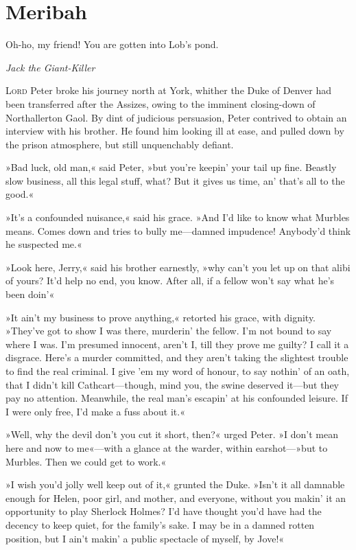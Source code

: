 
\chapter{Meribah}

\epigraph{Oh-ho, my friend! You are gotten into Lob's pond.}{\textit{Jack the Giant-Killer}}

\lettrine[lines=4]{L}{ord} Peter broke his journey north at York, whither the Duke of Denver had been transferred after the Assizes, owing to the imminent closing-down of Northallerton Gaol. By dint of judicious persuasion, Peter contrived to obtain an interview with his brother. He found him looking ill at ease, and pulled down by the prison atmosphere, but still unquenchably defiant.

»Bad luck, old man,« said Peter, »but you're keepin' your tail up fine. Beastly slow business, all this legal stuff, what? But it gives us time, an' that's all to the good.«

»It's a confounded nuisance,« said his grace. »And I'd like to know what Murbles means. Comes down and tries to bully me—damned impudence! Anybody'd think he suspected me.«

»Look here, Jerry,« said his brother earnestly, »why can't you let up on that alibi of yours? It'd help no end, you know. After all, if a fellow won't say what he's been doin'\longdash«

»It ain't my business to prove anything,« retorted his grace, with dignity. »They've got to show I was there, murderin' the fellow. I'm not bound to say where I was. I'm presumed innocent, aren't I, till they prove me guilty? I call it a disgrace. Here's a murder committed, and they aren't taking the slightest trouble to find the real criminal. I give 'em my word of honour, to say nothin' of an oath, that I didn't kill Cathcart—though, mind you, the swine deserved it—but they pay no attention. Meanwhile, the real man's escapin' at his confounded leisure. If I were only free, I'd make a fuss about it.«

»Well, why the devil don't you cut it short, then?« urged Peter. »I don't mean here and now to me«—with a glance at the warder, within earshot—»but to Murbles. Then we could get to work.«

»I wish you'd jolly well keep out of it,« grunted the Duke. »Isn't it all damnable enough for Helen, poor girl, and mother, and everyone, without you makin' it an opportunity to play Sherlock Holmes? I'd have thought you'd have had the decency to keep quiet, for the family's sake. I may be in a damned rotten position, but I ain't makin' a public spectacle of myself, by Jove!«

